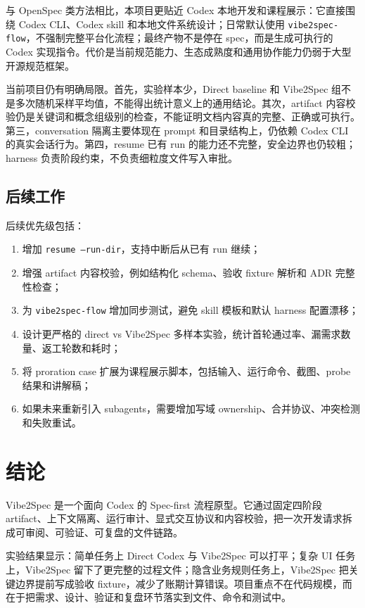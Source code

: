 \documentclass[11pt,a4paper]{article}
\newcommand{\code}[1]{\texttt{\small #1}}
\begin{document}
与 OpenSpec 类方法相比，本项目更贴近 Codex 本地开发和课程展示：它直接围绕 Codex CLI、Codex skill 和本地文件系统设计；日常默认使用 \code{vibe2spec-flow}，不强制完整平台化流程；最终产物不是停在 spec，而是生成可执行的 Codex 实现指令。代价是当前规范能力、生态成熟度和通用协作能力仍弱于大型开源规范框架。

当前项目仍有明确局限。首先，实验样本少，Direct baseline 和 Vibe2Spec 组不是多次随机采样平均值，不能得出统计意义上的通用结论。其次，artifact 内容校验仍是关键词和概念组级别的检查，不能证明文档内容真的完整、正确或可执行。第三，conversation 隔离主要体现在 prompt 和目录结构上，仍依赖 Codex CLI 的真实会话行为。第四，resume 已有 run 的能力还不完整，安全边界也仍较粗；harness 负责阶段约束，不负责细粒度文件写入审批。

\subsection{后续工作}

后续优先级包括：
\begin{enumerate}
  \item 增加 \code{resume --run-dir}，支持中断后从已有 run 继续；
  \item 增强 artifact 内容校验，例如结构化 schema、验收 fixture 解析和 ADR 完整性检查；
  \item 为 \code{vibe2spec-flow} 增加同步测试，避免 skill 模板和默认 harness 配置漂移；
  \item 设计更严格的 direct vs Vibe2Spec 多样本实验，统计首轮通过率、漏需求数量、返工轮数和耗时；
  \item 将 proration case 扩展为课程展示脚本，包括输入、运行命令、截图、probe 结果和讲解稿；
  \item 如果未来重新引入 subagents，需要增加写域 ownership、合并协议、冲突检测和失败重试。
\end{enumerate}

\section{结论}

Vibe2Spec 是一个面向 Codex 的 Spec-first 流程原型。它通过固定四阶段 artifact、上下文隔离、运行审计、显式交互协议和内容校验，把一次开发请求拆成可审阅、可验证、可复盘的文件链路。

实验结果显示：简单任务上 Direct Codex 与 Vibe2Spec 可以打平；复杂 UI 任务上，Vibe2Spec 留下了更完整的过程文件；隐含业务规则任务上，Vibe2Spec 把关键边界提前写成验收 fixture，减少了账期计算错误。项目重点不在代码规模，而在于把需求、设计、验证和复盘环节落实到文件、命令和测试中。
\end{document}

